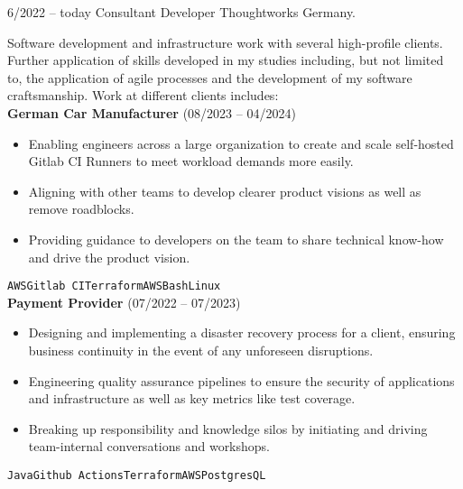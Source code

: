 \documentclass[9pt]{developercv} %
\begin{document}
\begin{entrylist}
	\entry
		{6/2022 -- today}
		{Consultant Developer}
		{Thoughtworks Germany.}
		{Software development and infrastructure work with several high-profile clients. Further application of skills developed in my studies including, but not limited to, the application of agile processes and the development of my software craftsmanship. Work at different clients includes:\\

        \textbf{German Car Manufacturer} {\footnotesize(08/2023 -- 04/2024)}
        \begin{itemize}
            \item Enabling engineers across a large organization to create and scale self-hosted Gitlab CI Runners to meet workload demands more easily.
            \item Aligning with other teams to develop clearer product visions as well as remove roadblocks.
            \item Providing guidance to developers on the team to share technical know-how and drive the product vision.
        \end{itemize}
  \texttt{AWS}\slashsep\texttt{Gitlab CI}\slashsep\texttt{Terraform}\slashsep\texttt{AWS}\slashsep\texttt{Bash}\slashsep\texttt{Linux}\\
  
        \textbf{Payment Provider} {\footnotesize(07/2022 -- 07/2023)}
        \begin{itemize}
            \item Designing and implementing a disaster recovery process for a client, ensuring business continuity in the event of any unforeseen disruptions.
            \item Engineering quality assurance pipelines to ensure the security of applications and infrastructure as well as key metrics like test coverage.
            \item Breaking up responsibility and knowledge silos by initiating and driving team-internal conversations and workshops.
        \end{itemize}
  \texttt{Java}\slashsep\texttt{Github Actions}\slashsep\texttt{Terraform}\slashsep\texttt{AWS}\slashsep\texttt{PostgresQL}
  
}
\end{entrylist}
\end{document}
